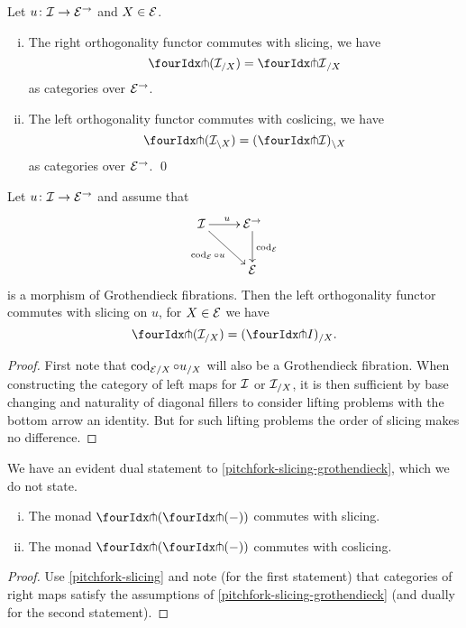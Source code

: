 \documentclass[reqno,10pt,a4paper,oneside,draft]{amsart}
\begin{document}
\begin{proposition} \label{pitchfork-slicing}
Let $u \co \cal{I} \to \catE^\to$ and $X \in \cal{E}$.
\begin{enumerate}[(i)]
\item The right orthogonality functor commutes with slicing, \ie we have
\[
  \liftr{(\cal{I}_{/X})} = {\liftr{\cal{I}}}_{/X}
\]
as categories over $\catE^\to$.
\item The left orthogonality functor commutes with coslicing, \ie we have
\[
  \liftl{(\cal{I}_{\backslash X})} = (\liftl{\cal{I}})_{\backslash X}
\]
as categories over $\catE^\to$.
\qed
\end{enumerate}
\end{proposition}

\begin{lemma} \label{pitchfork-slicing-grothendieck}
Let $u \co \cal{I} \to \cal{E}^\to$ and assume that
\[
\xymatrix{
  \cal{I}
  \ar[r]^{u}
  \ar[dr]_{\cod_{\cal{E}} \cc u}
&
  \cal{E}^\to
  \ar[d]^{\cod_{\cal{E}}}
\\&
  \cal{E}
}
\]
is a morphism of Grothendieck fibrations.
Then the left orthogonality functor commutes with slicing on $u$, \ie for $X \in \cal{E}$ we have
\[
  \liftl{(\cal{I}_{/X})} = (\liftl{I})_{/X}
.\]
\end{lemma}

\begin{proof}
First note that $\cod_{\cal{E}/X} \cc u_{/X}$ will also be a Grothendieck fibration.
When constructing the category of left maps for $\cal{I}$ or $\cal{I}_{/X}$, it is then sufficient by base changing and naturality of diagonal fillers to consider lifting problems with the bottom arrow an identity.
But for such lifting problems the order of slicing makes no difference.
\end{proof}

We have an evident dual statement to \cref{pitchfork-slicing-grothendieck}, which we do not state.

\begin{corollary} \label{pitchfork-slicing-monad}
\leavevmode
\begin{enumerate}[(i)]
\item The monad $\liftl{(\liftr{(-)})}$ commutes with slicing.
\item The monad $\liftr{(\liftl{(-)})}$ commutes with coslicing.
\end{enumerate}
\end{corollary}

\begin{proof}
Use \cref{pitchfork-slicing} and note (for the first statement) that categories of right maps satisfy the assumptions of \cref{pitchfork-slicing-grothendieck} (and dually for the second statement).
\end{proof}
\end{document}
